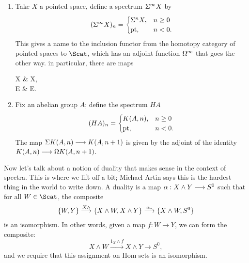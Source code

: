 \begin{enumerate}
\item Take $X$ a pointed space, define a spectrum $\Sigma^\infty X$ by \[(\Sigma^\infty X)_n =\begin{cases} \Sigma^n X,&n\geq0\\\mathrm{pt},&n<0.\end{cases}\]
This gives a name to the inclusion functor from the homotopy category of pointed spaces to $\Scat$, which has an adjoint function $\Omega^\infty$ that goes the other way.  in particular, there are maps
\begin{ctikzcd}
X \rar{\alpha} & \LoopsS \SuspendS X, \\
E & \lar["\beta"'] \SuspendS \LoopsS E.
\end{ctikzcd}
\item Fix an abelian group $A$; define the spectrum $HA$
\[(HA)_n =\begin{cases} K(A,n),&n\geq0\\\mathrm{pt},&n<0.\end{cases}\]
The map $\Sigma K(A, n) \longrightarrow K(A, n+1)$ is given by the adjoint of the identity $K(A, n) \longrightarrow \Omega K(A, n+1)$.
\end{enumerate}

Now let's talk about a notion of duality that makes sense in the context of spectra.  This is where we lift off a bit; Michael Artin says this is the hardest thing in the world to write down.  A duality is a map $\alpha: X \wedge Y \longrightarrow S^0$ such that for all $W \in \Scat$, the composite \[\{W, Y\} \stackrel{X \wedge}{\longrightarrow} \{X \wedge W, X \wedge Y\} \stackrel{\alpha_*}{\longrightarrow} \{X \wedge W, S^0\}\] is an isomorphism. In other words, given a map $f: W \to Y$, we can form the composite:
\[X\wedge W \xrightarrow{1_X \wedge f} X\wedge Y\to S^0,\]
and we require that this assignment on Hom-sets is an isomorphism.

